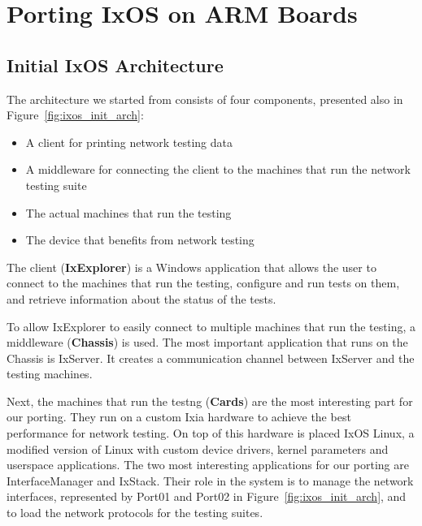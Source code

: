 \section{Porting IxOS on ARM Boards}

\subsection{Initial IxOS Architecture}

\begin{figure*}
    \centering
    \def\svgscale{0.95}
    
    \caption{Initial IxOS architecture}
    \label{fig:ixos_init_arch}
\end{figure*}

The architecture we started from consists of four components, presented also in
Figure~\ref{fig:ixos_init_arch}:
\begin{itemize}
    \item A client for printing network testing data
    \item A middleware for connecting the client to the machines that run the
    network testing suite
    \item The actual machines that run the testing
    \item The device that benefits from network testing
\end{itemize}

The client (\textbf{IxExplorer}) is a Windows application that allows the user to
connect to the machines that run the testing, configure and run tests on them,
and retrieve information about the status of the tests.

To allow IxExplorer to easily connect to multiple machines that run the testing,
a middleware (\textbf{Chassis}) is used. The most important application that runs on
the Chassis is IxServer. It creates a communication channel between IxServer and
the testing machines.

Next, the machines that run the testng (\textbf{Cards}) are the most interesting part
for our porting. They run on a custom Ixia hardware to achieve the best
performance for network testing. On top of this hardware is placed IxOS Linux,
a modified version of Linux with custom device drivers, kernel parameters and
userspace applications. The two most interesting applications for our porting
are InterfaceManager and IxStack. Their role in the system is to manage the
network interfaces, represented by Port01 and Port02 in Figure~\ref{fig:ixos_init_arch},
and to load the network protocols for the testing suites.

